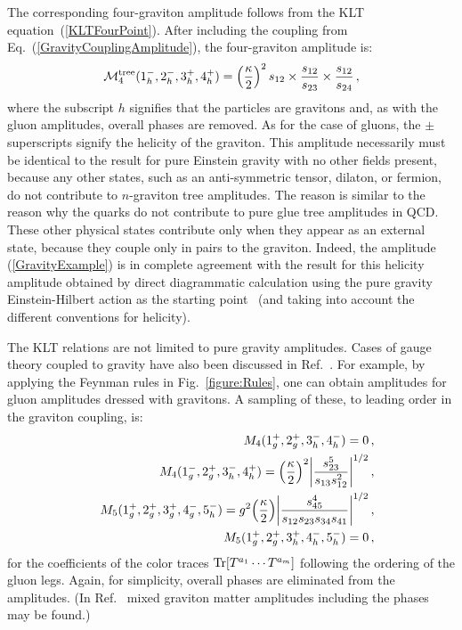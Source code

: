 The corresponding four-graviton amplitude follows 
from the KLT equation~(\ref{KLTFourPoint}).  After including the
coupling from Eq.~(\ref{GravityCouplingAmplitude}), the four-graviton
amplitude is:
%
\begin{equation}
{\cal M}_4^{\rm tree} (1^-_h, 2^-_h, 3^+_h, 4^+_h) = 
\left({\kappa \over 2} \right)^{2}  s_{12} \times  {s_{12} \over s_{23}}
\times  {s_{12} \over s_{24}} \,,
\label{GravityExample}
\end{equation}
%
where the subscript $h$ signifies that the particles are gravitons and,
as with the gluon amplitudes, overall phases are removed. As for the
case of gluons, the $\pm$ superscripts signify the helicity of the
graviton. This amplitude necessarily must be identical to the result
for pure Einstein gravity with no other fields present, because any
other states, such as an anti-symmetric tensor, dilaton, or fermion, do
not contribute to $n$-graviton tree amplitudes. The reason is similar
to the reason why the quarks do not contribute to pure glue tree amplitudes in
QCD. These other physical states contribute only when they appear as
an external state, because they couple only in pairs to the graviton.
Indeed, the amplitude (\ref{GravityExample}) is in complete agreement
with the result for this helicity amplitude obtained by direct
diagrammatic calculation using the pure gravity Einstein-Hilbert
action as the starting point~\cite{Berends74} (and taking into account the
different conventions for helicity).

The KLT relations are not limited to pure gravity
amplitudes.  Cases of gauge theory coupled to gravity have
also been discussed in Ref.~\cite{Square}.
For example, by applying the Feynman rules in Fig.~\ref{figure:Rules}, 
one can obtain amplitudes for gluon amplitudes dressed with gravitons.
A sampling of these, to leading order in the graviton coupling, 
is:
%
\begin{eqnarray}
&& M_4(1_g^+,2_g^+, 3_h^-, 4_h^-) =  0\,, \nonumber \\
%
&& M_4(1_g^-, 2_g^+, 3_h^-, 4_h^+) =  \Bigl({\kappa\over 2} \Bigr)^2
        \biggl| {s_{23}^5
                     \over s_{13} s_{12}^2} \biggr|^{1/2} \,, \nonumber\\
%
&&M_5(1_g^+, 2_g^+, 3_g^+, 4_g^-, 5_h^-) =  g^2 \Bigl({\kappa\over 2} \Bigr)
   \biggl| {s_{45}^4 \over s_{12} s_{23} s_{34} s_{41} } 
    \biggr|^{1/2}\,, \nonumber \\
%
&&M_5(1_g^+, 2_g^+, 3_h^+, 4_h^-, 5_h^-) = 0 \,, \nonumber \\
\end{eqnarray}
%
for the coefficients of the color traces ${\rm Tr} [T^{a_1} \cdots
T^{a_m}]$ following the ordering of the gluon legs.  Again, for
simplicity, overall phases are eliminated from the amplitudes.  (In
Ref.~\cite{Square} mixed graviton matter amplitudes including the
phases may be found.)

